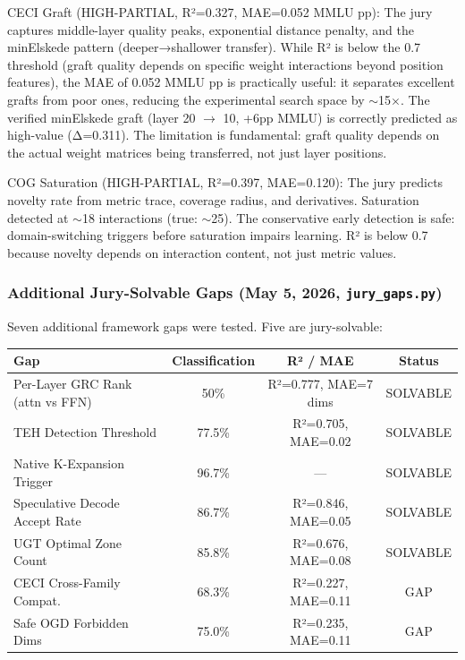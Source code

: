 \documentclass[11pt]{article}
\begin{document}
CECI Graft (HIGH-PARTIAL, R²=0.327, MAE=0.052 MMLU pp): The jury captures middle-layer quality peaks, exponential distance penalty, and the minElskede pattern (deeper→shallower transfer). While R² is below the 0.7 threshold (graft quality depends on specific weight interactions beyond position features), the MAE of 0.052 MMLU pp is practically useful: it separates excellent grafts from poor ones, reducing the experimental search space by $\sim$15$\times$. The verified minElskede graft (layer 20 $\to$ 10, +6pp MMLU) is correctly predicted as high-value (Δ=0.311). The limitation is fundamental: graft quality depends on the actual weight matrices being transferred, not just layer positions.

COG Saturation (HIGH-PARTIAL, R²=0.397, MAE=0.120): The jury predicts novelty rate from metric trace, coverage radius, and derivatives. Saturation detected at $\sim$18 interactions (true: $\sim$25). The conservative early detection is safe: domain-switching triggers before saturation impairs learning. R² is below 0.7 because novelty depends on interaction content, not just metric values.

\subsubsection*{Additional Jury-Solvable Gaps (May 5, 2026, \texttt{jury\_gaps.py})}

Seven additional framework gaps were tested. Five are jury-solvable:

\begin{center}
\begin{tabular}{lccc}
\toprule
Gap & Classification & R² / MAE & Status \\
\midrule
Per-Layer GRC Rank (attn vs FFN) & 50\% & R²=0.777, MAE=7 dims & SOLVABLE \\
TEH Detection Threshold & 77.5\% & R²=0.705, MAE=0.02 & SOLVABLE \\
Native K-Expansion Trigger & 96.7\% & --- & SOLVABLE \\
Speculative Decode Accept Rate & 86.7\% & R²=0.846, MAE=0.05 & SOLVABLE \\
UGT Optimal Zone Count & 85.8\% & R²=0.676, MAE=0.08 & SOLVABLE \\
CECI Cross-Family Compat. & 68.3\% & R²=0.227, MAE=0.11 & GAP \\
Safe OGD Forbidden Dims & 75.0\% & R²=0.235, MAE=0.11 & GAP \\
\bottomrule
\end{tabular}
\end{center}
\end{document}

